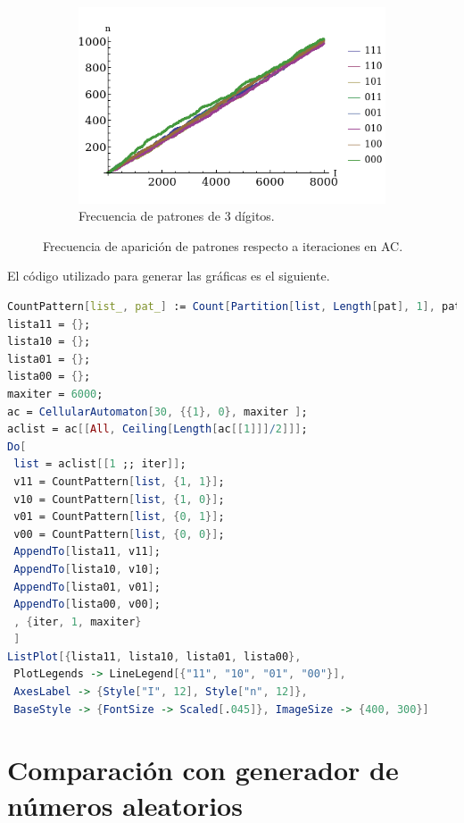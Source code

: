 \documentclass[letterpaper,11pt]{article}
\begin{document}
\begin{figure}[h!]
\begin{subfigure}{.5\textwidth}
	\centering
	\includegraphics[scale=0.55]{img/AC_Grupo3}
	\caption{Frecuencia de patrones de 3 dígitos.}
\end{subfigure}%
\caption{Frecuencia de aparición de patrones respecto a iteraciones en AC.}
\label{fig:acpat2}
\end{figure}

\clearpage

El código utilizado para generar las gráficas es el siguiente.
\begin{lstlisting}[language=Mathematica,caption={Código para patrones de dos dígitos}]
CountPattern[list_, pat_] := Count[Partition[list, Length[pat], 1], pat]
lista11 = {};
lista10 = {};
lista01 = {};
lista00 = {};
maxiter = 6000;
ac = CellularAutomaton[30, {{1}, 0}, maxiter ];
aclist = ac[[All, Ceiling[Length[ac[[1]]]/2]]];
Do[
 list = aclist[[1 ;; iter]];
 v11 = CountPattern[list, {1, 1}];
 v10 = CountPattern[list, {1, 0}];
 v01 = CountPattern[list, {0, 1}];
 v00 = CountPattern[list, {0, 0}];
 AppendTo[lista11, v11];
 AppendTo[lista10, v10];
 AppendTo[lista01, v01];
 AppendTo[lista00, v00];
 , {iter, 1, maxiter}
 ]
ListPlot[{lista11, lista10, lista01, lista00}, 
 PlotLegends -> LineLegend[{"11", "10", "01", "00"}], 
 AxesLabel -> {Style["I", 12], Style["n", 12]}, 
 BaseStyle -> {FontSize -> Scaled[.045]}, ImageSize -> {400, 300}]
\end{lstlisting}

\section{Comparación con generador de números aleatorios}
\end{document}
